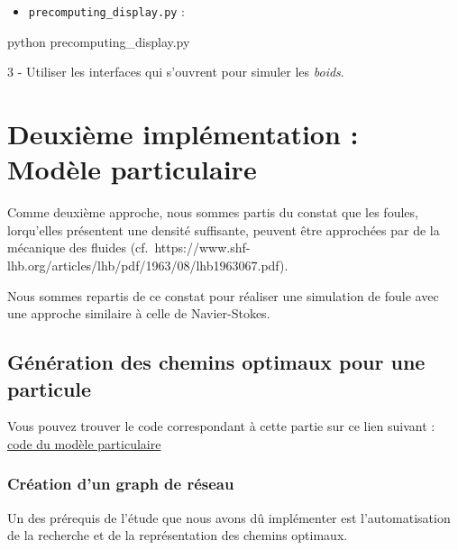 \documentclass[
]{article}
\newenvironment{Shaded}{}{}
\newcommand{\ExtensionTok}[1]{#1}
\newcommand{\NormalTok}[1]{#1}
\providecommand{\tightlist}{%
  \setlength{\itemsep}{0pt}\setlength{\parskip}{0pt}}
\begin{document}
\begin{itemize}
\tightlist
\item
  \texttt{precomputing\_display.py} :
\end{itemize}

\begin{Shaded}
\begin{Highlighting}[]
\ExtensionTok{python}\NormalTok{ precomputing\_display.py}
\end{Highlighting}
\end{Shaded}

3 - Utiliser les interfaces qui s'ouvrent pour simuler les \emph{boids}.

\hypertarget{deuxiuxe8me-impluxe9mentation-moduxe8le-particulaire}{%
\section{Deuxième implémentation : Modèle
particulaire}\label{deuxiuxe8me-impluxe9mentation-moduxe8le-particulaire}}

Comme deuxième approche, nous sommes partis du constat que les foules,
lorqu'elles présentent une densité suffisante, peuvent être approchées
par de la mécanique des fluides
(cf.~https://www.shf-lhb.org/articles/lhb/pdf/1963/08/lhb1963067.pdf).

Nous sommes repartis de ce constat pour réaliser une simulation de foule
avec une approche similaire à celle de Navier-Stokes.

\hypertarget{guxe9nuxe9ration-des-chemins-optimaux-pour-une-particule}{%
\subsection{Génération des chemins optimaux pour une
particule}\label{guxe9nuxe9ration-des-chemins-optimaux-pour-une-particule}}

Vous pouvez trouver le code correspondant à cette partie sur ce lien
suivant :
\href{https://github.com/Polarolouis/BoidSimulation/blob/boid_flow/dijkstra.py}{code
du modèle particulaire}

\hypertarget{cruxe9ation-dun-graph-de-ruxe9seau}{%
\subsubsection{Création d'un graph de
réseau}\label{cruxe9ation-dun-graph-de-ruxe9seau}}

Un des prérequis de l'étude que nous avons dû implémenter est
l'automatisation de la recherche et de la représentation des chemins
optimaux.
\end{document}

